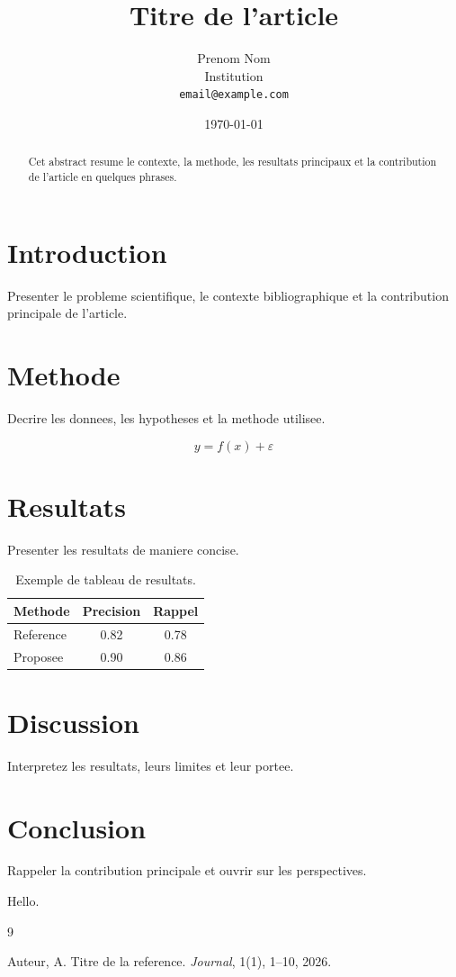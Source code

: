 \documentclass[11pt,a4paper]{article}
\title{Titre de l'article}
\author{Prenom Nom\\Institution\\\texttt{email@example.com}}
\date{\today}
\begin{document}
\maketitle

\begin{abstract}
Cet abstract resume le contexte, la methode, les resultats principaux et la contribution de l'article en quelques phrases.
\end{abstract}

\section{Introduction}

Presenter le probleme scientifique, le contexte bibliographique et la contribution principale de l'article.

\section{Methode}

Decrire les donnees, les hypotheses et la methode utilisee.

\begin{equation}
  y = f(x) + \varepsilon
\end{equation}

\section{Resultats}

Presenter les resultats de maniere concise.

\begin{table}[h]
  \centering
  \caption{Exemple de tableau de resultats.}
  \begin{tabular}{lcc}
    \toprule
    Methode & Precision & Rappel \\
    \midrule
    Reference & 0.82 & 0.78 \\
    Proposee & 0.90 & 0.86 \\
    \bottomrule
  \end{tabular}
  \label{tab:resultats}
\end{table}

\section{Discussion}

Interpretez les resultats, leurs limites et leur portee.

\section{Conclusion}

Rappeler la contribution principale et ouvrir sur les perspectives.


Hello.


\begin{thebibliography}{9}

Auteur, A.
\newblock Titre de la reference.
\newblock \emph{Journal}, 1(1), 1--10, 2026.

\end{thebibliography}
\end{document}
